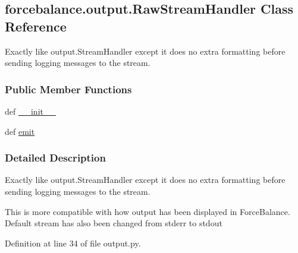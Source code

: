 \hypertarget{classforcebalance_1_1output_1_1RawStreamHandler}{\subsection{forcebalance.\-output.\-Raw\-Stream\-Handler \-Class \-Reference}
\label{classforcebalance_1_1output_1_1RawStreamHandler}
}


\-Exactly like output.\-Stream\-Handler except it does no extra formatting before sending logging messages to the stream.  


\subsubsection*{\-Public \-Member \-Functions}
\begin{DoxyCompactItemize}
\item 
def \hyperlink{classforcebalance_1_1output_1_1RawStreamHandler_ac18b4f71580b45365b05630a3e74dea8}{\-\_\-\-\_\-init\-\_\-\-\_\-}
\item 
def \hyperlink{classforcebalance_1_1output_1_1RawStreamHandler_afad8f30df1c81ce5ee43baad1362120b}{emit}
\end{DoxyCompactItemize}


\subsubsection{\-Detailed \-Description}
\-Exactly like output.\-Stream\-Handler except it does no extra formatting before sending logging messages to the stream. 

\-This is more compatible with how output has been displayed in \-Force\-Balance. \-Default stream has also been changed from stderr to stdout 

\-Definition at line 34 of file output.\-py.



